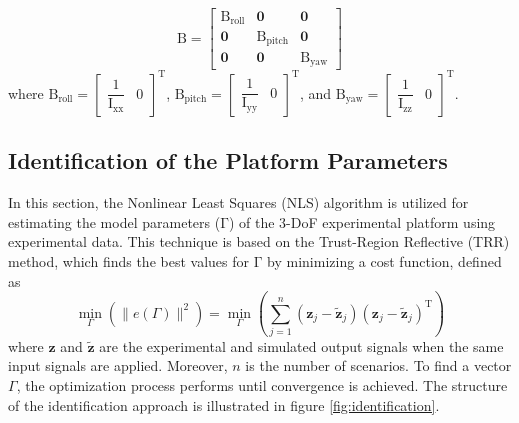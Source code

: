 \documentclass[3p]{elsarticle}
\begin{document}
\begin{equation}
	\boldsymbol{\mathrm{B}} =
	\begin{bmatrix}
		\boldsymbol{{\mathrm{B_{\text{roll}}}}} & \boldsymbol{0} & \boldsymbol{0}\\
		\boldsymbol{0} & \boldsymbol{{\mathrm{B_{\text{pitch}}}}} & \boldsymbol{0} \\
		\boldsymbol{0} & \boldsymbol{0} & \boldsymbol{{\mathrm{B_{\text{yaw}}}}}
	\end{bmatrix}
\end{equation}
where $\boldsymbol{\mathrm{B}}_{\text{roll}}  = \begin{bmatrix}
	\dfrac{1}{\mathrm{I}_{\text{xx}}}
	&
	0
\end{bmatrix}^{\mathrm{T}}$, $\boldsymbol{\mathrm{B}}_{\text{pitch}}  = \begin{bmatrix}
	\dfrac{1}{\mathrm{I}_{\text{yy}}}
	&
	0
\end{bmatrix}^{\mathrm{T}}$, and $\boldsymbol{\mathrm{B}}_{\text{yaw}}  = \begin{bmatrix}
	\dfrac{1}{\mathrm{I}_{\text{zz}}}
	&
	0
\end{bmatrix}^{\mathrm{T}}$.
\subsection{Identification of the Platform Parameters}
\noindent In this section, the Nonlinear Least Squares (NLS) algorithm is utilized for estimating the model parameters ($\boldsymbol{\mathrm{\Gamma}}$) of the 3-DoF experimental platform using experimental data.
This technique is based on the Trust-Region Reflective (TRR) method, which finds the best values for $\boldsymbol{\mathrm{\Gamma}}$ by minimizing a cost function, defined as
\begin{equation}
	\min_{\Gamma}\left(\parallel e(\Gamma) \parallel^2\right) = 
	\min_{\Gamma} \left(\sum_{j=1}^{n}(\boldsymbol{z}_j- \tilde{\boldsymbol{z}}_j)(\boldsymbol{z}_j- \tilde{\boldsymbol{z}}_j)^\mathrm{T}\right)
\end{equation} %
where $\boldsymbol{z}$ and $\tilde{\boldsymbol{z}}$ are the experimental and simulated output signals when the same input signals are applied.
Moreover, $n$ is the number of scenarios.
To find a vector $\Gamma$, the optimization process performs until convergence is achieved. %
The structure of the identification approach is illustrated in figure \ref{fig:identification}.
\end{document}
